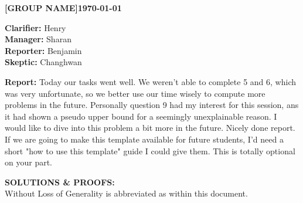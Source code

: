 \documentclass[11pt]{article}
\newcommand{\teamname}{[GROUP NAME]}
\newcommand{\reportdate}{\today}
\begin{document}
\thispagestyle{firstpage}

\noindent\textbf{\teamname}\hfill\textbf{\reportdate}

\noindent\textbf{Clarifier:} Henry\\
\textbf{Manager:} Sharan\\
\textbf{Reporter:} Benjamin\\
\textbf{Skeptic:} Changhwan


\textbf{Report:} Today our tasks went well. We weren't able to complete 5 and 6, which was very unfortunate, so we better use our time wisely to compute more problems in the future. Personally question 9 had my interest for this session, ans it had shown a pseudo upper bound for a seemingly unexplainable reason. I would like to dive into this problem a bit more in the future. 
\color{docshaw} Nicely done report. If we are going to make this template available for future students, I'd need a short "how to use this template" guide I could give them. This is totally optional on your part.
\color{black}
\divider

\textbf{SOLUTIONS \& PROOFS:}\\
Without Loss of Generality is abbreviated as \WLoG{} within this document.
\end{document}
